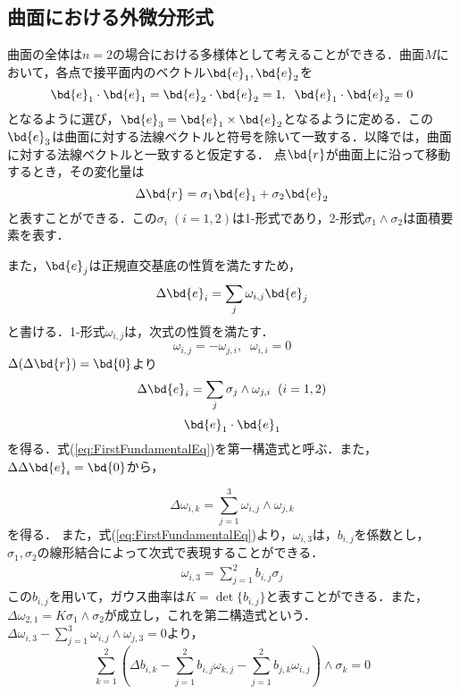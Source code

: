 	\subsection{曲面における外微分形式}
		曲面の全体は$ n=2 $の場合における多様体として考えることができる．曲面$ M $において，各点で接平面内のベクトル$ \bd{e}_1,\bd{e}_2 $を
		\begin{equation}\label{eq:e1e2}
			\bd{e}_1 \cdot \bd{e}_1 = \bd{e}_2 \cdot \bd{e}_2 = 1, \;\; \bd{e}_1 \cdot \bd{e}_2  = 0
		\end{equation}
		となるように選び，$ \bd{e}_3 = \bd{e}_1 \times \bd{e}_2 $となるように定める．この$ \bd{e}_3 $は曲面に対する法線ベクトルと符号を除いて一致する．以降では，曲面に対する法線ベクトルと一致すると仮定する．
		点$ \bd{r} $が曲面上に沿って移動するとき，その変化量は
		\begin{equation}\label{eq:dreq}
			\Delta \bd{r} = \sigma_1 \bd{e}_1 + \sigma_2 \bd{e}_2
		\end{equation}
		と表すことができる．この$ \sigma_i \;(i=1,2) $は1-形式であり，2-形式$ \sigma_1 \wedge \sigma_2 $は面積要素を表す．
		
		また，$ \bd{e}_j $は正規直交基底の性質を満たすため，
		\begin{equation}\label{eq:de_jeq}
			\Delta \bd{e}_i = \sum_j \omega_{i,j} \bd{e}_j
		\end{equation}
		と書ける．1-形式$ \omega_{i,j} $は，次式の性質を満たす．
		\begin{equation}\label{eq:omega_ijeq}
			\omega_{i,j} = - \omega_{j,i},\;\; \omega_{i,i} = 0
		\end{equation}
		$ \Delta (\Delta \bd{r}) = \bd{0} $より
		\begin{equation}
			\Delta \bd{e}_i = \sum_j \sigma_j \wedge \omega_{j,i}\;\;(i=1,2) 
		\end{equation}
		\begin{equation}\label{eq:FirstFundamentalEq}
			\bd{e}_1 \cdot \bd{e}_1
		\end{equation}
		を得る．式(\ref{eq:FirstFundamentalEq})を第一構造式と呼ぶ．また，$ \Delta \Delta \bd{e}_i =\bd{0}$から，
		
		\begin{equation}\label{eq:d_omgEq}
			\Delta \omega_{i,k} = \sum_{j=1}^{3} \omega_{i,j} \wedge \omega_{j,k}
		\end{equation}
		を得る．
		また，式(\ref{eq:FirstFundamentalEq})より，$ \omega_{i,3} $は，$ b_{i,j} $を係数とし，$ \sigma_1,\sigma_2 $の線形結合によって次式で表現することができる．
		\begin{eqnarray}
			\omega_{i,3} = \sum_{j=1}^2 b_{i,j} \sigma_j
		\end{eqnarray}
		この$ b_{i,j} $を用いて，ガウス曲率は$ K=\det \{b_{i,j}\} $と表すことができる．また，$ \Delta \omega_{2,1} = K \sigma_1 \wedge \sigma_2  $が成立し，これを第二構造式という．
		$ \Delta \omega_{i,3} - \sum_{j=1}^{3} \omega_{i,j} \wedge \omega_{j,3} = 0 $より，
		\begin{equation}\label{eq:DeltaBeq}
			\sum_{k=1}^{2} (\Delta b_{i,k} - \sum_{j=1}^2 b_{i,j} \omega_{k,j} - \sum_{j=1}^2 b_{j,k} \omega_{i,j}) \wedge \sigma_k = 0
		\end{equation}